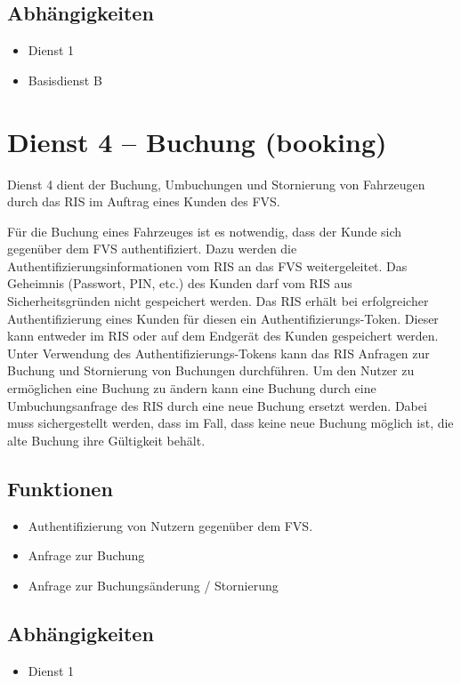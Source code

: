 \subsection*{Abhängigkeiten}
\begin{itemize}
\item Dienst 1
\item Basisdienst B
\end{itemize}


\section{Dienst 4 -- Buchung (booking)}
Dienst 4 dient der Buchung, Umbuchungen und Stornierung von Fahrzeugen durch das RIS im Auftrag eines Kunden des FVS.

Für die Buchung eines Fahrzeuges ist es notwendig, dass der Kunde sich gegenüber dem FVS authentifiziert. Dazu werden die Authentifizierungsinformationen vom RIS an das FVS weitergeleitet. Das Geheimnis (Passwort, PIN, etc.) des Kunden darf vom RIS aus Sicherheitsgründen nicht gespeichert werden. Das RIS erhält bei erfolgreicher Authentifizierung eines Kunden für diesen ein Authentifizierungs-Token. Dieser kann entweder im RIS oder auf dem Endgerät des Kunden gespeichert werden. Unter Verwendung des Authentifizierungs-Tokens kann das RIS Anfragen zur Buchung und Stornierung von Buchungen durchführen. 
Um den Nutzer zu ermöglichen eine Buchung zu ändern kann eine Buchung durch eine Umbuchungsanfrage des RIS durch eine neue Buchung ersetzt werden. Dabei muss sichergestellt werden, dass im Fall, dass keine neue Buchung möglich ist, die alte Buchung ihre Gültigkeit behält.

\subsection*{Funktionen}
\begin{itemize}
\item Authentifizierung von Nutzern gegenüber dem FVS.
\item Anfrage zur Buchung
\item Anfrage zur Buchungsänderung / Stornierung
\end{itemize}

\subsection*{Abhängigkeiten}
\begin{itemize}
\item Dienst 1
\end{itemize}

